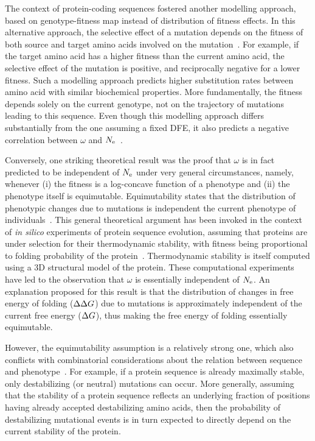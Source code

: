 The context of protein-coding sequences fostered another modelling approach, based on genotype-fitness map instead of distribution of fitness effects.
In this alternative approach, the selective effect of a mutation depends on the fitness of both source and target amino acids involved on the mutation~\citep{Halpern1998, Rodrigue2010, Tamuri2012}.
For example, if the target amino acid has a higher fitness than the current amino acid, the selective effect of the mutation is positive, and reciprocally negative for a lower fitness.
Such a modelling approach predicts higher substitution rates between amino acid with similar biochemical properties.
More fundamentally, the fitness depends solely on the current genotype, not on the trajectory of mutations leading to this sequence.
Even though this modelling approach differs substantially from the one assuming a fixed \acrshort{DFE}, it also predicts a negative correlation between $\omega$ and $N_{\mathrm{e}}$~\citep{Spielman2015, DosReis2015}.

Conversely, one striking theoretical result was the proof that $\omega$ is in fact predicted to be independent of $N_{\mathrm{e}}$ under very general circumstances, namely, whenever (i) the fitness is a log-concave function of a phenotype and (ii) the phenotype itself is equimutable.
Equimutability states that the distribution of phenotypic changes due to mutations is independent the current phenotype of individuals~\citep{Cherry1998}.
This general theoretical argument has been invoked in the context of \textit{in silico} experiments of protein sequence evolution, assuming that proteins are under selection for their thermodynamic stability, with fitness being proportional to folding probability of the protein~\citep{Goldstein2013}.
Thermodynamic stability is itself computed using a 3D structural model of the protein.
These computational experiments have led to the observation that $\omega$ is essentially independent of $N_{\mathrm{e}}$.
An explanation proposed for this result is that the distribution of changes in free energy of folding ($\Delta \Delta G$) due to mutations is approximately independent of the current free energy ($\Delta G$), thus making the free energy of folding essentially equimutable.

However, the equimutability assumption is a relatively strong one, which also conflicts with combinatorial considerations about the relation between sequence and phenotype~\citep{Serohijos2012}.
For example, if a protein sequence is already maximally stable, only destabilizing (or neutral) mutations can occur.
More generally, assuming that the stability of a protein sequence reflects an underlying fraction of positions having already accepted destabilizing amino acids, then the probability of destabilizing mutational events is in turn expected to directly depend on the current stability of the protein.

